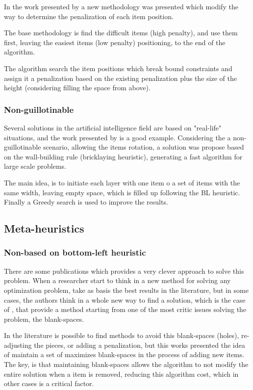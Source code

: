 In the work presented by \cite{burke}
a new methodology was presented which modify the
way to determine the penalization of each item position.

The base methodology is find the difficult items (high penalty),
and use them first, leaving the easiest items (low penalty)
positioning, to the end of the algorithm.

The algorithm search the item positions which break bound
constraints and assign it a penalization based on the existing
penalization plus the size of the height (considering filling the space
from above).

\subsubsection{Non-guillotinable}

Several solutions in the artificial intelligence field
are based on "real-life" situations, and the work presented
by \cite{leung} is a good example.
Considering the a non-guillotinable scenario, allowing
the items rotation, a solution was propose based on
the wall-building rule (bricklaying heuristic), generating a fast algorithm
for large scale problems.

The main idea, is to initiate each layer with one item o
a set of items with the same width, leaving empty space,
which is filled up following the BL heuristic.
Finally a Greedy search is used to improve the results.



\subsection{Meta-heuristics}

\subsubsection{Non-based on bottom-left heuristic}

There are some publications which provides a very clever
approach to solve this problem.
When a researcher start to think in a new method for
solving any optimization problem, take as basis
the best results in the literature,
but in some cases, the authors think in a whole new way
to find a solution, which is the case of \cite{neveu},
that provide a method starting from one of the most critic
issues solving the problem, the blank-spaces.

In the literature is possible to find methods to avoid
this blank-spaces (holes), re-adjusting the pieces,
or adding a penalization, but this works presented the
idea of maintain a set of maximizes blank-spaces in the
process of adding new items.
The key, is that maintaining blank-spaces allows the
algorithm to not modify the entire solution when a item
is removed, reducing this algorithm cost,
which in other cases is a critical factor.

